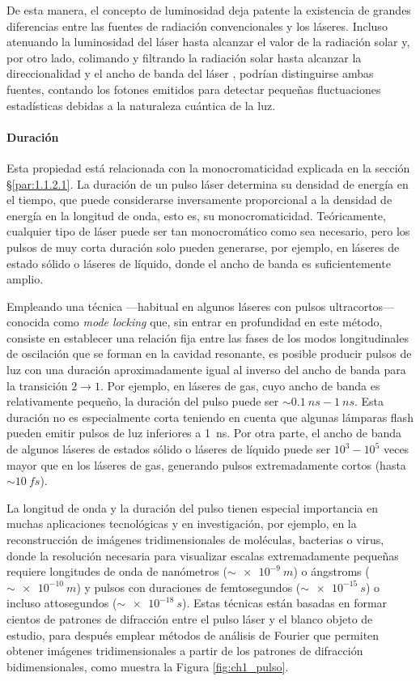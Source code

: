 De esta manera, el concepto de luminosidad deja patente la existencia de grandes diferencias entre las fuentes de radiación convencionales y los láseres. Incluso atenuando la luminosidad del láser  hasta alcanzar el valor de la radiación solar y, por otro lado, colimando y filtrando la radiación solar hasta alcanzar la direccionalidad y el ancho de banda del láser , podrían distinguirse ambas fuentes, contando los fotones emitidos para detectar pequeñas fluctuaciones estadísticas debidas a la naturaleza cuántica de la luz. 

\paragraph{Duración}\label{par:1.1.2.5}
Esta propiedad está relacionada con la monocromaticidad explicada en la sección \S\ref{par:1.1.2.1}. La duración de un pulso láser determina su densidad de energía en el tiempo, que puede considerarse inversamente proporcional a la densidad de energía en la longitud de onda, esto es, su monocromaticidad\autocite{Svelto2010}. Teóricamente, cualquier tipo de láser puede ser tan monocromático como sea necesario, pero los pulsos de muy corta duración solo pueden generarse, por ejemplo, en láseres de estado sólido o láseres de líquido, donde el ancho de banda es suficientemente amplio.

Empleando una técnica ---habitual en algunos láseres con pulsos ultracortos--- conocida como \emph{mode locking} que, sin entrar en profundidad en este método, consiste en establecer una relación fija entre las fases de los modos longitudinales de oscilación que se forman en la cavidad resonante, es posible producir pulsos de luz con una duración aproximadamente igual al inverso del ancho de banda para la transición $2 \rightarrow 1$. Por ejemplo, en láseres de gas, cuyo ancho de banda es relativamente pequeño, la duración del pulso puede ser $\sim\qty{0,1}{ns}-\qty{1}{ns}$. Esta duración no es especialmente corta teniendo en cuenta que algunas lámparas flash pueden emitir pulsos de luz inferiores a \qty{1}{ns}. Por otra parte, el ancho de banda de algunos láseres de estados sólido o láseres de líquido puede ser $10^3-10^5$ veces mayor que en los láseres de gas, generando pulsos extremadamente cortos (hasta $\sim\qty{10}{fs}$).

La longitud de onda y la duración del pulso tienen especial importancia en muchas aplicaciones tecnológicas y en investigación, por ejemplo, en la reconstrucción de imágenes tridimensionales de moléculas\autocite{vonArdenne2018}, bacterias o virus\autocite{Ekeberg2015}, donde la resolución necesaria para visualizar escalas extremadamente pequeñas requiere longitudes de onda de nanómetros ($\sim\qty{e-9}{m}$) o ángstroms ($\sim\qty{e-10}{m}$) y pulsos con duraciones de femtosegundos ($\sim\qty{e-15}{s}$) o incluso attosegundos ($\sim\qty{e-18}{s}$). Estas técnicas están basadas en formar cientos de patrones de difracción entre el pulso láser y el blanco objeto de estudio, para después emplear métodos de análisis de Fourier que permiten obtener imágenes tridimensionales a partir de los patrones de difracción bidimensionales, como muestra la Figura \ref{fig:ch1_pulso}.

